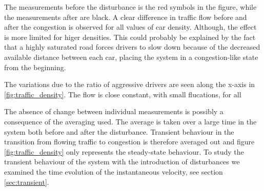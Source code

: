 \documentclass[11pt,a4paper,twocolumn]{article}
\begin{document}
 The measurements before the disturbance is the red symbols in the figure, while the measurements after are black. A clear difference in traffic flow before and after the congestion is observed for all values of car density. Although, the effect is more limited for higer densities. This could probably be explained by the fact that a highly saturated road forces drivers to slow down because of the decreased available distance between each car, placing the system in a congestion-like state from the beginning.

 The variations due to the ratio of aggressive drivers are seen along the x-axis in \ref{fig:traffic_density}. The flow is close constant, with small flucations, for all  

 The absence of change between individual measurements is possibly a consequence of the averaging used. The average is taken over a large time in the system both before and after the disturbance. Transient behaviour in the transition from flowing traffic to congestion is therefore averaged out and figure \ref{fig:traffic_density} only represents the steady-state behaviour. To study the transient behaviour of the system with the introduction of disturbances we examined the time evolution of the instantaneous velocity, see section \ref{sec:transient}. 
\end{document}
